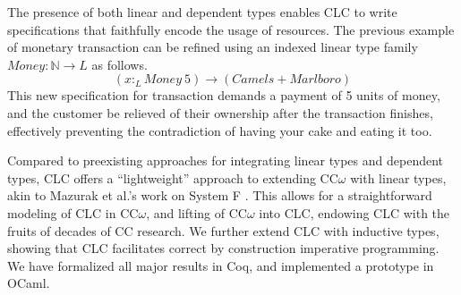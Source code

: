 \documentclass[sigplan,screen]{acmart}
\theoremstyle{definition}
\newcommand{\ltype}{:_{\scriptscriptstyle L}}
\begin{document}
  The presence of both linear and dependent types enables CLC to write specifications that faithfully encode the usage of resources. The previous example of monetary transaction can be refined using an indexed linear type family $Money : \mathbb{N} \rightarrow L$ as follows.
  \begin{equation*}
    (x \ltype Money\ 5) \rightarrow (Camels + Marlboro)
  \end{equation*}
  This new specification for transaction demands a payment of 5 units of money, and the customer be relieved of their ownership after the transaction finishes, effectively preventing the contradiction of having your cake and eating it too.

  Compared to preexisting approaches for integrating linear types and dependent types, CLC offers a ``lightweight'' approach to extending CC$\omega$ with linear types, akin to Mazurak et al.'s work on System F \cite{mazurak}. This allows for a straightforward modeling of CLC in CC$\omega$, and lifting of CC$\omega$ into CLC, endowing CLC with the fruits of decades of CC research. We further extend CLC with inductive types, showing that CLC facilitates correct by construction imperative programming. We have formalized all major results in Coq, and implemented a prototype in OCaml. 

  \medskip
\end{document}
